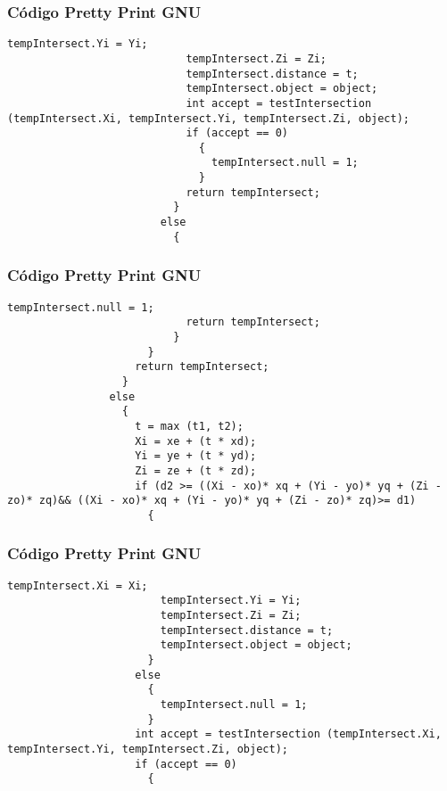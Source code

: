 \documentclass{beamer}
\begin{document}
\begin{frame}[fragile]
\frametitle{C\'odigo Pretty Print GNU}
\begin{lstlisting}[style=CStyle]
                            tempIntersect.Yi = Yi;
                            tempIntersect.Zi = Zi;
                            tempIntersect.distance = t;
                            tempIntersect.object = object;
                            int accept = testIntersection (tempIntersect.Xi, tempIntersect.Yi, tempIntersect.Zi, object);
                            if (accept == 0)
                              {
                                tempIntersect.null = 1;
                              }
                            return tempIntersect;
                          }
                        else
                          {
                            \end{lstlisting}
\end{frame}
\begin{frame}[fragile]
\frametitle{C\'odigo Pretty Print GNU}
\begin{lstlisting}[style=CStyle]
                            tempIntersect.null = 1;
                            return tempIntersect;
                          }
                      }
                    return tempIntersect;
                  }
                else
                  {
                    t = max (t1, t2);
                    Xi = xe + (t * xd);
                    Yi = ye + (t * yd);
                    Zi = ze + (t * zd);
                    if (d2 >= ((Xi - xo)* xq + (Yi - yo)* yq + (Zi - zo)* zq)&& ((Xi - xo)* xq + (Yi - yo)* yq + (Zi - zo)* zq)>= d1)
                      {
                        \end{lstlisting}
\end{frame}
\begin{frame}[fragile]
\frametitle{C\'odigo Pretty Print GNU}
\begin{lstlisting}[style=CStyle]
                        tempIntersect.Xi = Xi;
                        tempIntersect.Yi = Yi;
                        tempIntersect.Zi = Zi;
                        tempIntersect.distance = t;
                        tempIntersect.object = object;
                      }
                    else
                      {
                        tempIntersect.null = 1;
                      }
                    int accept = testIntersection (tempIntersect.Xi, tempIntersect.Yi, tempIntersect.Zi, object);
                    if (accept == 0)
                      {
                        \end{lstlisting}
\end{frame}
\end{document}
